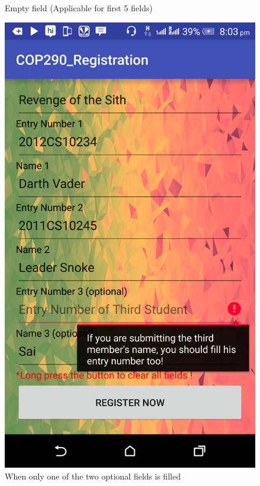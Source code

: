 \documentclass[12pt]{article}
\begin{document}
\begin{figure}[!htb]
\begin{minipage}[b]{0.4\textwidth}
    \caption{Empty field (Applicable for first 5 fields)}
  \end{minipage}
  \hfill
  \begin{minipage}[b]{0.4\textwidth}
    \includegraphics[width=\textwidth]{images/optional.png}
    \caption{When only one of the two optional fields is filled}
  \end{minipage}
\end{figure}
\end{document}
